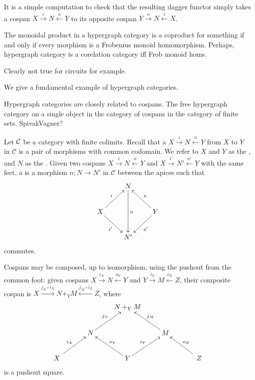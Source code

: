 \begin{example}
  It is a simple computation to check that the resulting dagger functor simply
  takes a cospan $X \stackrel{i}{\longrightarrow} N \stackrel{o}{\longleftarrow}
  Y$ to its opposite cospan $Y \stackrel{o}{\longrightarrow} N
  \stackrel{i}{\longleftarrow} X$.
\end{example}

\begin{proposition}
  The monoidal product in a hypergraph category is a coproduct for something if and only if
  every morphism is a Frobenius monoid homomorphism. Perhaps, hypergraph
  category is a corelation category iff Frob monoid homs.
\end{proposition}

Clearly not true for circuits for example.


We give a fundamental example of hypergraph categories.

  Hypergraph categories are closely related to cospans. The free hypergraph
  category on a single object in the category of cospans in the category of
  finite sets. SpivakVagner?
  
  Let $\mathcal C$ be a category with finite colimits.
Recall that a  $X \stackrel{i}{\longrightarrow} N
\stackrel{o}{\longleftarrow} Y$  from $X$ to $Y$ in $\mathcal C$ is a pair of
morphisms with common codomain. We refer to $X$ and $Y$ as the ,
and $N$ as the .  Given two cospans $X
\stackrel{i}{\longrightarrow} N \stackrel{o}{\longleftarrow} Y$ and $X
\stackrel{i'}{\longrightarrow} N' \stackrel{o'}{\longleftarrow} Y$ with the same
feet, a  is a morphism $n\colon  N \to N'$ in $\mathcal
C$ between the apices such that
\[
  \xymatrix{
    & N \ar[dd]^n  \\
    X \ar[ur]^{i} \ar[dr]_{i'} && Y \ar[ul]_{o} \ar[dl]^{o'}\\
    & N'
  }
\]
commutes.

Cospans may be composed, up to isomorphism, using the pushout from the common
foot: given cospans $X \stackrel{i_X}{\longrightarrow} N
\stackrel{o_Y}{\longleftarrow} Y$ and $Y \stackrel{i_Y}{\longrightarrow} M
\stackrel{o_Z}{\longleftarrow} Z$, their composite cospan is $X \stackrel{j_N
  \circ i_X}{\longrightarrow} N+_YM \stackrel{j_M\circ i_Z}{\longleftarrow} Z$,
  where 
\[
  \xymatrix{
    && N+_YM \\
    & N \ar[ur]^{j_N} && M \ar[ul]_{j_M} \\
    \quad X \quad \ar[ur]^{i_X} && Y \ar[ul]_{o_Y} \ar[ur]^{i_Y} && \quad Z \quad \ar[ul]_{o_Z}
  }
\]
is a pushout square. 


